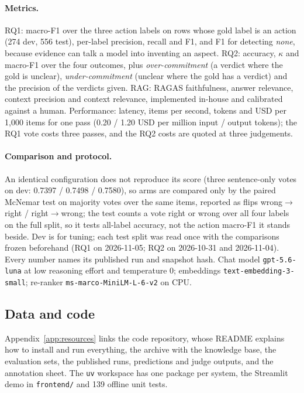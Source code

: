 \documentclass[11pt]{article}
\newcommand{\chatmodel}{\texttt{gpt-5.6-luna}}
\newcommand{\embmodel}{\texttt{text-embedding-3-small}}
\newcommand{\reranker}{\texttt{ms-marco-MiniLM-L-6-v2}}
\newcommand{\kappaval}{$\kappa$}
\begin{document}
\paragraph{Metrics.}
RQ1: macro-F1 over the three action labels on rows whose gold label is an action (274 dev, 556 test), per-label precision, recall and F1, and F1 for detecting \emph{none}, because evidence can talk a model into inventing an aspect. RQ2: accuracy, \kappaval{} and macro-F1 over the four outcomes, plus \emph{over-commitment} (a verdict where the gold is unclear), \emph{under-commitment} (unclear where the gold has a verdict) and the precision of the verdicts given. RAG: RAGAS faithfulness, answer relevance, context precision and context relevance, implemented in-house and calibrated against a human. Performance: latency, items per second, tokens and USD per 1,000 items for one pass (0.20 / 1.20 USD per million input / output tokens); the RQ1 vote costs three passes, and the RQ2 costs are quoted at three judgements.

\paragraph{Comparison and protocol.}
An identical configuration does not reproduce its score (three sentence-only votes on dev: 0.7397 / 0.7498 / 0.7580), so arms are compared only by the paired McNemar test on majority votes over the same items, reported as flips wrong$\to$right / right$\to$wrong; the test counts a vote right or wrong over all four labels on the full split, so it tests all-label accuracy, not the action macro-F1 it stands beside. Dev is for tuning; each test split was read once with the comparisons frozen beforehand (RQ1 on 2026-11-05; RQ2 on 2026-10-31 and 2026-11-04). Every number names its published run and snapshot hash. Chat model \chatmodel{} at low reasoning effort and temperature 0; embeddings \embmodel{}; re-ranker \reranker{} on CPU.

\subsection{Data and code}
\label{sec:resources}
Appendix~\ref{app:resources} links the code repository, whose README explains how to install and run everything, the archive with the knowledge base, the evaluation sets, the published runs, predictions and judge outputs, and the annotation sheet. The \texttt{uv} workspace has one package per system, the Streamlit demo in \texttt{frontend/} and 139 offline unit tests.
\end{document}
